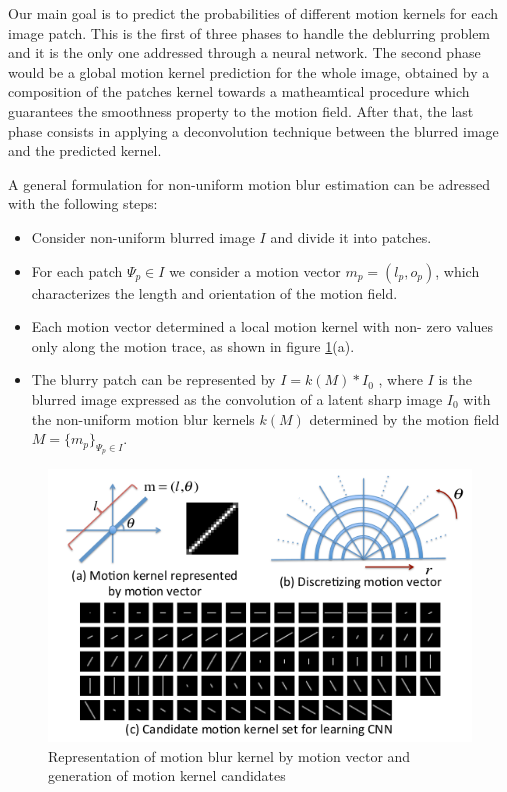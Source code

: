 \documentclass[12pt,a4paper]{report}
\begin{document}
Our main goal is to predict the probabilities of different motion kernels for each image patch. This is the first of three phases to handle the deblurring problem and it is the only one addressed through a neural network. The second phase would be a global motion kernel prediction for the whole image, obtained by a composition of the patches kernel towards a matheamtical procedure which guarantees the smoothness property to the motion field. After that, the last phase consists in applying a deconvolution technique between the blurred image and the predicted kernel. 

A general formulation for non-uniform motion blur estimation can be adressed with the following steps:

\begin{itemize}
\item Consider non-uniform blurred image $I$ and divide it into patches.
\item For each patch $\Psi_p\in I$ we consider a motion vector $m_p = (l_p , o_p )$, which characterizes the length and orientation of the motion field.
\item Each motion vector determined a local motion kernel with non-
zero values only along the motion trace, as shown in figure \ref{motion_kernel}(a).
\item The blurry patch can be represented by $I = k(M)*I_0$ , where $I$ is the blurred image expressed as the convolution of a latent sharp image $I_0$ with the non-uniform motion blur kernels $k(M)$ determined by the motion field $M = \lbrace m_p\rbrace _{\Psi_p\in I}$.
\end{itemize}

\begin{figure}[hptb]
\centering
\includegraphics[scale=0.5]{motion_kernel.png} 
\caption{Representation of motion blur kernel by motion vector
and generation of motion kernel candidates}
\label{motion_kernel}
\end{figure}
\end{document}
